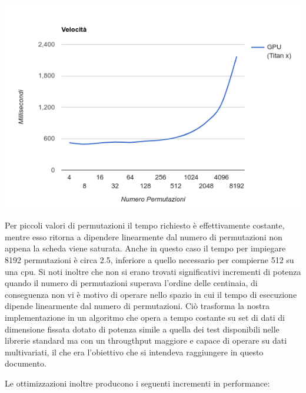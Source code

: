 \begin{center}
\includegraphics[width=\linewidth]{analisi}
\end{center}
Per piccoli valori di permutazioni il tempo richiesto è effettivamente costante, mentre esso ritorna a dipendere linearmente dal numero di permutazioni non appena la scheda viene saturata.
Anche in questo caso il tempo per impiegare 8192 permutazioni è circa 2.5, inferiore a quello necessario per compierne 512 su una cpu. Si noti inoltre che non si erano trovati significativi incrementi di potenza quando il numero di permutazioni superava l'ordine delle centinaia, di conseguenza non vi è motivo di operare nello spazio in cui il tempo di esecuzione dipende linearmente dal numero di permutazioni. Ciò trasforma la nostra implementazione in un algoritmo che opera a tempo costante su set di dati di dimensione fissata dotato di potenza simile a quella dei test disponibili nelle librerie standard ma con un througthput maggiore e capace di operare su dati multivariati, il che era l'obiettivo che si intendeva raggiungere in questo documento.

Le ottimizzazioni inoltre producono i seguenti incrementi in performance:

